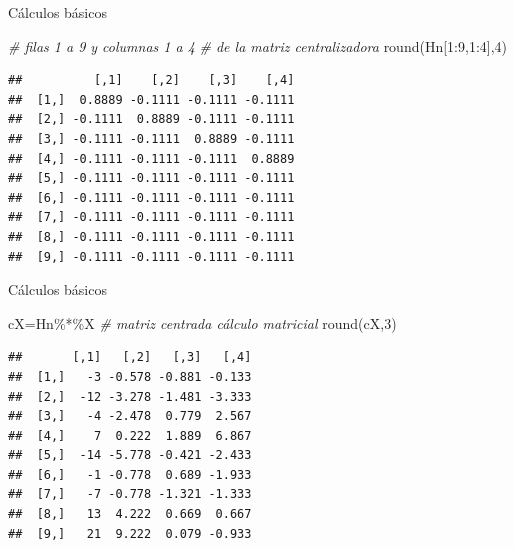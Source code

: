 \documentclass[
  ignorenonframetext,
]{beamer}
\newenvironment{Shaded}{\begin{snugshade}}{\end{snugshade}}
\newcommand{\CommentTok}[1]{\textcolor[rgb]{0.56,0.35,0.01}{\textit{#1}}}
\newcommand{\DecValTok}[1]{\textcolor[rgb]{0.00,0.00,0.81}{#1}}
\newcommand{\FunctionTok}[1]{\textcolor[rgb]{0.00,0.00,0.00}{#1}}
\newcommand{\NormalTok}[1]{#1}
\newcommand{\OtherTok}[1]{\textcolor[rgb]{0.56,0.35,0.01}{#1}}
\newcommand{\SpecialCharTok}[1]{\textcolor[rgb]{0.00,0.00,0.00}{#1}}
\begin{document}
\begin{frame}[fragile]{Cálculos básicos}
\protect\hypertarget{cuxe1lculos-buxe1sicos-2}{}
\begin{Shaded}
\begin{Highlighting}[]
\CommentTok{\# filas 1 a 9 y columnas 1 a 4 }
\CommentTok{\# de la matriz centralizadora}
\FunctionTok{round}\NormalTok{(Hn[}\DecValTok{1}\SpecialCharTok{:}\DecValTok{9}\NormalTok{,}\DecValTok{1}\SpecialCharTok{:}\DecValTok{4}\NormalTok{],}\DecValTok{4}\NormalTok{)}
\end{Highlighting}
\end{Shaded}

\begin{verbatim}
##          [,1]    [,2]    [,3]    [,4]
##  [1,]  0.8889 -0.1111 -0.1111 -0.1111
##  [2,] -0.1111  0.8889 -0.1111 -0.1111
##  [3,] -0.1111 -0.1111  0.8889 -0.1111
##  [4,] -0.1111 -0.1111 -0.1111  0.8889
##  [5,] -0.1111 -0.1111 -0.1111 -0.1111
##  [6,] -0.1111 -0.1111 -0.1111 -0.1111
##  [7,] -0.1111 -0.1111 -0.1111 -0.1111
##  [8,] -0.1111 -0.1111 -0.1111 -0.1111
##  [9,] -0.1111 -0.1111 -0.1111 -0.1111
\end{verbatim}
\end{frame}

\begin{frame}[fragile]{Cálculos básicos}
\protect\hypertarget{cuxe1lculos-buxe1sicos-3}{}
\begin{Shaded}
\begin{Highlighting}[]
\NormalTok{cX}\OtherTok{=}\NormalTok{Hn}\SpecialCharTok{\%*\%}\NormalTok{X }\CommentTok{\# matriz centrada cálculo matricial}
\FunctionTok{round}\NormalTok{(cX,}\DecValTok{3}\NormalTok{)}
\end{Highlighting}
\end{Shaded}

\begin{verbatim}
##       [,1]   [,2]   [,3]   [,4]
##  [1,]   -3 -0.578 -0.881 -0.133
##  [2,]  -12 -3.278 -1.481 -3.333
##  [3,]   -4 -2.478  0.779  2.567
##  [4,]    7  0.222  1.889  6.867
##  [5,]  -14 -5.778 -0.421 -2.433
##  [6,]   -1 -0.778  0.689 -1.933
##  [7,]   -7 -0.778 -1.321 -1.333
##  [8,]   13  4.222  0.669  0.667
##  [9,]   21  9.222  0.079 -0.933
\end{verbatim}
\end{frame}
\end{document}
